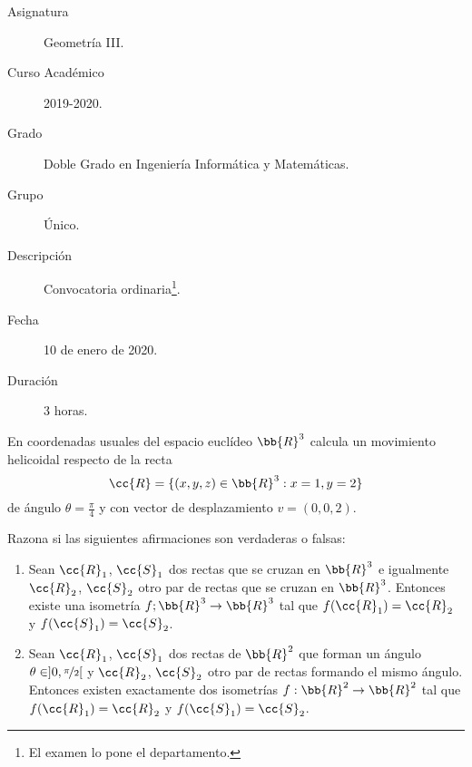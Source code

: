 \documentclass[12pt]{article}
\begin{document}

    
    

    
    \begin{description}
        \item[Asignatura] Geometría III.
        \item[Curso Académico] 2019-2020.
        \item[Grado] Doble Grado en Ingeniería Informática y Matemáticas.
        \item[Grupo] Único.
        \item[Descripción] Convocatoria ordinaria\footnote{El examen lo pone el departamento.}.
        \item[Fecha] 10 de enero de 2020.
        \item[Duración] 3 horas.
    
    \end{description}
    \newpage

   \begin{ejercicio}
        En coordenadas usuales del espacio euclídeo $\bb{R}^3$ calcula un movimiento helicoidal respecto de la recta
        \[
            \cc{R}=\{(x,y,z)\in \bb{R}^3 : x=1,y=2\}
        \]
        de ángulo $\theta=\frac{\pi}{4}$ y con vector de desplazamiento $v=(0,0,2)$.
   \end{ejercicio}

   \begin{ejercicio}
    Razona si las siguientes afirmaciones son verdaderas o falsas:
    \begin{enumerate}
        \item Sean $\cc{R}_1$, $\cc{S}_1$ dos rectas que se cruzan en $\bb{R}^3$ e igualmente $\cc{R}_2$, $\cc{S}_2$ otro par de rectas que se cruzan en $\bb{R}^3$.
        Entonces existe una isometría $f;\bb{R}^3 \rightarrow \bb{R}^3$ tal que $f(\cc{R}_1)=\cc{R}_2$ y $f(\cc{S}_1)=\cc{S}_2$.
        \item Sean $\cc{R}_1$, $\cc{S}_1$ dos rectas de $\bb{R}^2$ que forman un ángulo $\theta \in ]0,\nicefrac{\pi}{2}[$ y $\cc{R}_2$, $\cc{S}_2$ otro par de rectas formando el mismo ángulo. 
        Entonces existen exactamente dos isometrías $f:\bb{R}^2 \rightarrow \bb{R}^2$ tal que $f(\cc{R}_1)=\cc{R}_2$ y $f(\cc{S}_1)=\cc{S}_2$.
    \end{enumerate}
   \end{ejercicio}
\end{document}
